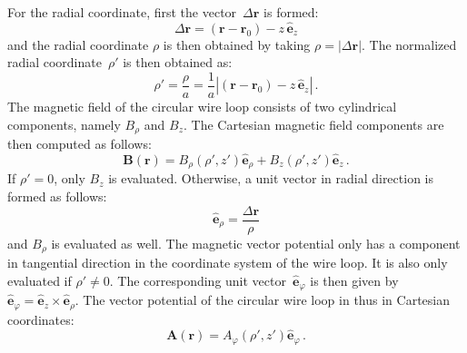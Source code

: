 For the radial coordinate, first the vector~$\Delta \mathbf{r}$ is formed:
\begin{equation}
  \Delta \mathbf{r} = (\mathbf{r} - \mathbf{r}_0) - z \, \hat{\mathbf{e}}_z
\end{equation}
and the radial coordinate $\rho$ is then obtained by taking $\rho = |\Delta \mathbf{r}|$.
The normalized radial coordinate~$\rho'$ is then obtained as:
\begin{equation}
  \rho' = \frac{\rho}{a} = \frac{1}{a} |(\mathbf{r} - \mathbf{r}_0) - z \, \hat{\mathbf{e}}_z| \, .
\end{equation}
The magnetic field of the circular wire loop consists of two cylindrical components, namely $B_\rho$ and $B_z$.
The Cartesian magnetic field components are then computed as follows:
\begin{equation}
  \mathbf{B}(\mathbf{r}) = B_\rho(\rho', z') \hat{\mathbf{e}}_\rho + B_z(\rho', z') \hat{\mathbf{e}}_z \, .
\end{equation}
If $\rho' = 0$, only $B_z$ is evaluated.
Otherwise, a unit vector in radial direction is formed as follows:
\begin{equation}
  \hat{\mathbf{e}}_\rho = \frac{\Delta \mathbf{r}}{\rho}
\end{equation}
and $B_\rho$ is evaluated as well.
The magnetic vector potential only has a component in tangential direction in the coordinate system of the wire loop.
It is also only evaluated if $\rho' \neq 0$.
The corresponding unit vector~$\hat{\mathbf{e}}_\varphi$ is then given by
$\hat{\mathbf{e}}_\varphi = \hat{\mathbf{e}}_z \times \hat{\mathbf{e}}_\rho$.
The vector potential of the circular wire loop in thus in Cartesian coordinates:
\begin{equation}
  \mathbf{A}(\mathbf{r}) = A_\varphi(\rho', z') \hat{\mathbf{e}}_\varphi \, .
\end{equation}

\FloatBarrier
